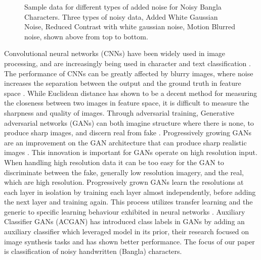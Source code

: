 \documentclass[runningheads]{llncs}
\begin{document}
\begin{figure*}[t!]
\begin{center}
\hspace{5pt}
\hspace{5pt}
\hspace{5pt}
\caption{Sample data for different types of added noise for Noisy Bangla Characters. Three types of noisy data, Added White Gaussian Noise, Reduced Contrast with white gaussian noise, Motion Blurred noise, shown above from top to bottom.}
\label{fig:sample}
\end{center} 
\end{figure*}

Convolutional neural networks (CNNs)  \cite{cactus,deepsat,theoretical,hariharan2015hypercolumns, krizhevsky2012imagenet} have been widely used  in image processing, and are increasingly being used in  character and text classification \cite{Karki18}. The performance of CNNs can be greatly affected by blurry images, where  noise increases the separation between the output and the ground truth in feature space \cite{pathak2016context}. While Euclidean distance has shown to be a decent method for measuring the closeness between two images in feature space, it is difficult to measure the sharpness and quality of images. Through adversarial training, Generative adversarial networks (GANs)  can both imagine structure where there is none, to produce sharp images, and discern real from fake \cite{Goodfellow-GAN}. Progressively growing GANs are an improvement on the GAN architecture that can produce sharp realistic images \cite{nvidia2017progressive}. This innovation is important for GANs operate on high resolution input. When handling high resolution data it can be too easy for the GAN to discriminate between the fake, generally low resolution imagery, and the real,  which are high resolution. Progressively grown GANs learn the resolutions at each layer in isolation by training each layer almost independently, before adding the next layer and training again. This process utilizes transfer learning and the generic to specific learning behaviour exhibited in neural networks \cite{yosinski2014transferable}. Auxiliary Classifier GANs (ACGAN) \cite{google} has introduced class labels in GANs by adding an auxiliary classifier which leveraged model in its prior, their research focused on image synthesis tasks and has shown better performance. The focus of our paper is classification of noisy handwritten (Bangla) characters. 
\end{document}

